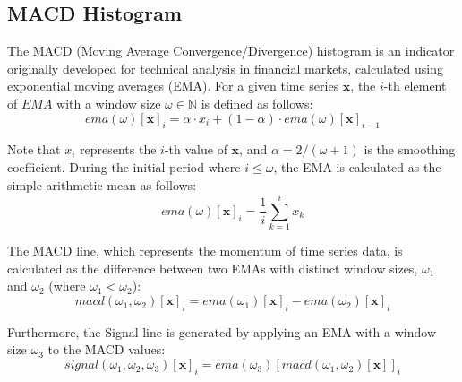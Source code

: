 \documentclass[conference]{IEEEtran}
\begin{document}
\subsection{MACD Histogram}

The MACD (Moving Average Convergence/Divergence) histogram \cite{murphy1999technical} is an indicator originally developed for technical analysis in financial markets, calculated using exponential moving averages (EMA). For a given time series $\mathbf{x}$, the $i$-th element of $EMA$ with a window size $\omega \in \mathbb{N}$ is defined as follows:
\begin{equation}
	ema(\omega)[\mathbf{x}]_i = \alpha \cdot x_i + (1-\alpha) \cdot ema(\omega)[\mathbf{x}]_{i-1}
\end{equation}

Note that $x_i$ represents the $i$-th value of $\mathbf{x}$, and $\alpha = 2/(\omega + 1)$ is the smoothing coefficient. During the initial period where $i \le \omega$, the EMA is calculated as the simple arithmetic mean as follows:
\begin{equation}
ema(\omega)[\mathbf{x}]_i = \frac{1}{i} \sum_{k=1}^{i} x_k
\end{equation}

The MACD line, which represents the momentum of time series data, is calculated as the difference between two EMAs with distinct window sizes, $\omega_1$ and $\omega_2$ (where $\omega_1 < \omega_2$):
\begin{equation}
macd(\omega_1, \omega_2)[\mathbf{x}]_i = ema(\omega_1)[\mathbf{x}]_i - ema(\omega_2)[\mathbf{x}]_i
\end{equation}

Furthermore, the Signal line is generated by applying an EMA with a window size $\omega_3$ to the MACD values:
\begin{equation}
signal(\omega_1, \omega_2, \omega_3)[\mathbf{x}]_i = ema(\omega_3)[macd(\omega_1, \omega_2)[\mathbf{x}]]_i
\end{equation}
\end{document}
